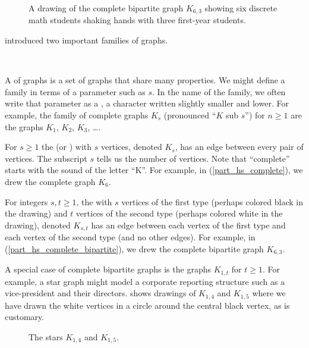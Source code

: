 \begin{exam} 
\begin{apart}
             \begin{figure} [hbtp]
                 \centering
                 
                 \caption{A drawing of the complete bipartite graph $K_{6,3}$ showing six discrete math students shaking hands with three first-year students.}
                 \label{fig_K6b3}
             \end{figure}
    \end{apart}  
\end{exam}

 introduced two important families of graphs.

\begin{defn}
\label{defn_complete_completebipartite}
~
    \begin{apart}
        \item A  of graphs is a set of graphs that share many properties. We might define a family in terms of a parameter such as $s$.  In the name of the family, we often write that parameter as a , a character written slightly smaller and lower. For example, the family of complete graphs $K_s$ (pronounced ``$K$ sub $s$'') for $n\ge1$ are the graphs $K_1$, $K_2$, $K_3$, \ldots.  
        
        \item For $s \ge 1$ the  (or ) with $s$ vertices, denoted $K_s$, has an edge between every pair of vertices. The subscript $s$ tells us the number of vertices.  Note that ``complete'' starts with the sound of the letter ``K''.   For example, in  (\ref{part_hs_complete}), we drew  the complete graph $K_6$. 

        \item For integers $s,t \ge 1$, the  with $s$ vertices of the first type (perhaps colored black in the drawing) and $t$ vertices of the second type (perhaps colored white in the drawing), denoted $K_{s,t}$ has an edge between each vertex of the first type and each vertex of the second type (and no other edges). For example, in  (\ref{part_hs_complete_bipartite}), we drew the complete bipartite graph $K_{6,3}$.   
        \item A special case of complete bipartite graphs is the  graphs $K_{1,t}$ for $t\ge1$.  For example, a star graph might model a corporate reporting structure such as a vice-president and their directors.  shows drawings of $K_{1,4}$ and $K_{1,5}$ where we have drawn the white vertices in a circle around the central black  vertex, as is customary. 
        
            \begin{figure}[ht]
                \centering            
                \caption{The stars $K_{1,4}$ and $K_{1,5}$.}                \label{fig_stars_K1b4_K1b5}
            \end{figure}        
    \end{apart}   
\end{defn}

